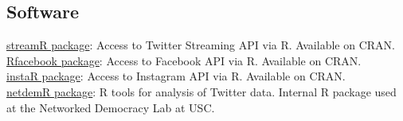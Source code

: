 \documentclass[margin,line,11pt]{resume}
\newcommand{\nl}{\vspace{0.10in}\\}
\begin{document}
\begin{resume}
   
    




    
        \section{\mysidestyle Software}
    
\href{http://cran.r-project.org/web/packages/streamR/}{streamR package}: Access to Twitter Streaming API via R. Available on CRAN. \nl
\href{http://cran.r-project.org/web/packages/Rfacebook/index.html}{Rfacebook package}: Access to Facebook API via R. Available on CRAN. \nl
\href{http://cran.r-project.org/web/packages/instaR/index.html}{instaR package}: Access to Instagram API via R. Available on CRAN. \nl
\href{https://github.com/netdem-USC/netdemR}{netdemR package}: R tools for analysis of Twitter data. Internal R package used at the Networked Democracy Lab at USC. 

\newpage


\end{resume}
\end{document}
